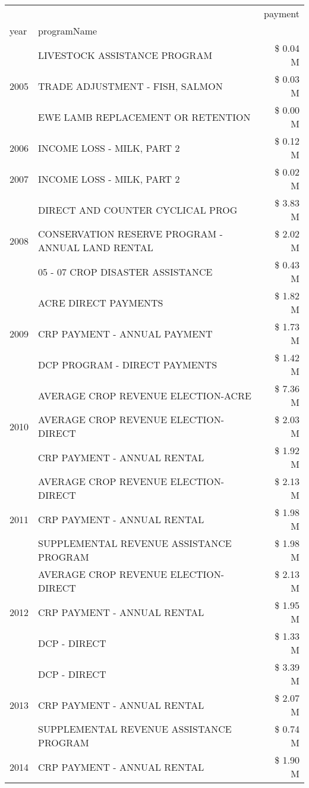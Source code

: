 \begin{tabular}{llr}
\toprule
 &  & payment \\
year & programName &  \\
\midrule
\multirow[t]{3}{*}{2005} & LIVESTOCK ASSISTANCE PROGRAM & \$ 0.04 M \\
 & TRADE ADJUSTMENT - FISH, SALMON & \$ 0.03 M \\
 & EWE LAMB REPLACEMENT OR RETENTION & \$ 0.00 M \\
\cline{1-3}
2006 & INCOME LOSS - MILK, PART 2 & \$ 0.12 M \\
\cline{1-3}
2007 & INCOME LOSS - MILK, PART 2 & \$ 0.02 M \\
\cline{1-3}
\multirow[t]{3}{*}{2008} & DIRECT AND COUNTER CYCLICAL PROG & \$ 3.83 M \\
 & CONSERVATION RESERVE PROGRAM - ANNUAL LAND RENTAL & \$ 2.02 M \\
 & 05 - 07 CROP DISASTER ASSISTANCE & \$ 0.43 M \\
\cline{1-3}
\multirow[t]{3}{*}{2009} & ACRE DIRECT PAYMENTS & \$ 1.82 M \\
 & CRP PAYMENT - ANNUAL PAYMENT & \$ 1.73 M \\
 & DCP PROGRAM - DIRECT PAYMENTS & \$ 1.42 M \\
\cline{1-3}
\multirow[t]{3}{*}{2010} & AVERAGE CROP REVENUE ELECTION-ACRE & \$ 7.36 M \\
 & AVERAGE CROP REVENUE ELECTION-DIRECT & \$ 2.03 M \\
 & CRP PAYMENT - ANNUAL RENTAL & \$ 1.92 M \\
\cline{1-3}
\multirow[t]{3}{*}{2011} & AVERAGE CROP REVENUE ELECTION-DIRECT & \$ 2.13 M \\
 & CRP PAYMENT - ANNUAL RENTAL & \$ 1.98 M \\
 & SUPPLEMENTAL REVENUE ASSISTANCE PROGRAM & \$ 1.98 M \\
\cline{1-3}
\multirow[t]{3}{*}{2012} & AVERAGE CROP REVENUE ELECTION-DIRECT & \$ 2.13 M \\
 & CRP PAYMENT - ANNUAL RENTAL & \$ 1.95 M \\
 & DCP - DIRECT & \$ 1.33 M \\
\cline{1-3}
\multirow[t]{3}{*}{2013} & DCP - DIRECT & \$ 3.39 M \\
 & CRP PAYMENT - ANNUAL RENTAL & \$ 2.07 M \\
 & SUPPLEMENTAL REVENUE ASSISTANCE PROGRAM & \$ 0.74 M \\
\cline{1-3}
\multirow[t]{3}{*}{2014} & CRP PAYMENT - ANNUAL RENTAL & \$ 1.90 M \\

\end{tabular}

